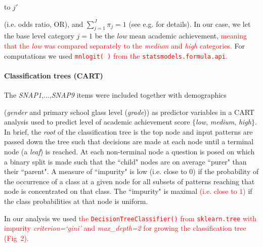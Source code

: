 \documentclass[10pt,letterpaper]{article}
\begin{document}
to $j'$ {(i.e. odds ratio, OR), and $\sum_{j=1}^J \pi_j = 1$ (see e.g. \cite{Bilder2015} for details).
In our case, we let the base level category $j=1$ be the {\it low} mean academic achievement, \textcolor{red}{meaning that the {\it low} was compared separately to 
the {\it medium} and {\it high} categories.}
For computations we used  \textcolor{red}{{\tt \small mnlogit( )} from the {\tt \small statsmodels.formula.api}.} \\

\vspace{3mm}

\paragraph{Classification trees (CART)}
The {\it SNAP1},$\ldots$,{\it SNAP9} items were included together with demographics {(\emph{gender} and primary school glass level ({\it grade})) as predictor variables in a CART analysis \cite{Breiman2001} used to predict level of academic achievement score $\{$\emph{low}, \emph{medium}, \emph{high}$\}$.
In brief, the \emph{root} of the classification tree is the top node and input patterns are passed down the tree such that decisions are made at each node until a terminal 
node (a \emph{leaf}) is reached. At each non-terminal node a question is posed on which a binary split is made such that the ``child" nodes are on average ``purer" than their ``parent". 
A measure of ``impurity" is 
low (i.e. close to $0$) if the probability of the occurrence of a class at a given node for all subsets of patterns reaching that node is concentrated on that class. 
The ``impurity" is maximal \textcolor{red}{(i.e. close to $1$)} if the class probabilities at that node is uniform. 
         
In our analysis we used \textcolor{red}{the {\tt \small DecisionTreeClassifier()}  from {\tt \small sklearn.tree} with impurity {\it criterion=`gini'} and {\it max\_depth=2}
for growing the classification tree (Fig~2).}

}}
\end{document}
